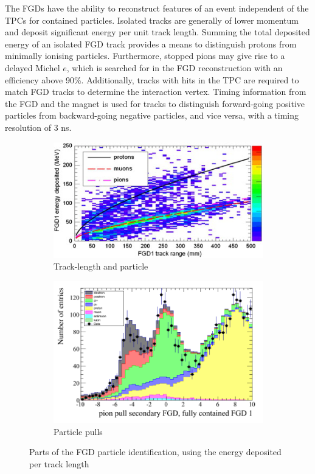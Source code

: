 The FGDs have the ability to reconstruct features of an event independent of the TPCs for contained particles. Isolated tracks are generally of lower momentum and deposit significant energy per unit track length. Summing the total deposited energy of an isolated FGD track provides a means to distinguish protons from minimally ionising particles. Furthermore, stopped pions may give rise to a delayed Michel $e$, which is searched for in the FGD reconstruction with an efficiency above 90\%\cite{thesis_christine}. Additionally, tracks with hits in the TPC are required to match FGD tracks to determine the interaction vertex. Timing information from the FGD and the magnet is used for tracks to distinguish forward-going positive particles from backward-going negative particles, and vice versa, with a timing resolution of 3 ns.
\begin{figure}[h]
	\begin{subfigure}[t]{0.47\textwidth}
		\includegraphics[width=\textwidth, trim={0mm 0mm 0mm 0mm}, clip,page=1]{figures/det_chap/fgd/fgd_byrange}
		\caption{Track-length and particle}
	\end{subfigure}
	\begin{subfigure}[t]{0.47\textwidth}
		\includegraphics[width=\textwidth, trim={0mm 0mm 0mm 0mm}, clip,page=1]{figures/numu/Cuts/pull_secondarytrack_FGD_all_fullycontained}
		\caption{Particle pulls}
	\end{subfigure}	
	\caption{Parts of the FGD particle identification, using the energy deposited per track length}
	\label{fig:fgd_reco}
\end{figure}

